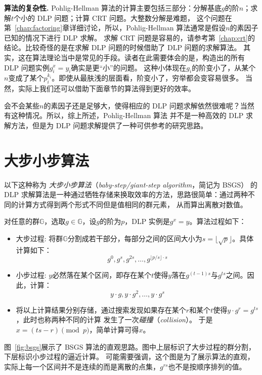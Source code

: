 \noindent \textbf{算法的复杂性.}
Pohlig-Hellman 算法的计算主要包括三部分：分解基底$g$的阶$n$；求解$t$个小的 DLP 问题；计算 CRT 问题。大整数分解是难题，
这个问题在第~\ref{chap:factoring}章详细讨论，所以，Pohlig-Hellman 算法通常是假设$n$的素因子已知的情况下进行 DLP 求解。
求解 CRT 问题是容易的，请参考第~\ref{chap:crt}的结论。比较奇怪的是在求解 DLP 问题的时候借助了 DLP 问题的求解算法。
其实，这在算法理论当中是常见的手段。读者在此需要体会的是，构造出的所有 DLP 问题实例$g_i^x  = y_i$确实是更“小”的问题。
这种小体现在$g_i$的阶变小了，从某个$n$变成了某个$p_i^{k_i}$。即使从最肤浅的层面看，阶变小了，穷举都会变容易很多。
当然，实际上我们还可以借助下面章节的算法得到更好的效率。

会不会某些$n$的素因子还是足够大，使得相应的 DLP 问题求解依然很难呢？当然有这种情况。所以，综上所述，Pohlig-Hellman 算法
并不是一种高效的 DLP 求解方法，但是为 DLP 问题求解提供了一种可供参考的研究思路。

\section{大步小步算法}
\label{sec:bsgs}
以下这种称为
\emph{大步小步算法}（\emph{baby-step/giant-step algorithm}，简记为 BSGS）
的 DLP 求解算法是一种通过牺牲存储来换取效率的方法，思路很简单：通过两种不同的计算方式得到两个形式不同但是值相同的群元素，
从而算出离散对数值。

对任意的群$\mathbb{G}$，选取$g \in \mathbb{G}$，设$g$的阶为$p$，DLP 实例是$g^x = y$。算法过程如下：
\begin{itemize}
\item 大步过程:  将群$\mathbb{G}$分割成若干部分，每部分之间的区间大小为$s = \lfloor \sqrt{p} \rfloor$。具体计算如下：
\[ g^0, g^s, g^{2s}, \ldots , g^{\lfloor p/s \rfloor \cdot s} \]

\item 小步过程: $y$必然落在某个区间，即存在某个$t$使得$y$落在$g^{(t-1)s}$与$g^{ts} $之间。因此，计算：
\[y\cdot g, y\cdot g^2, \ldots, y\cdot g^s\]

\item 将以上计算结果分别存储，通过搜索发现如果存在某个$r$和某个$t$使得$y \cdot g^r = g^{t s}$，此时也称两种不同的计算
发生了一次\emph{碰撞}（\emph{collision}）。
于是$x = (ts - r) \pmod{p}$，简单计算可得$x$。
\end{itemize}

图~\ref{fig:bsgs}展示了 BSGS 算法的直观思路。图中上层标识了大步过程的群分割，下层标识小步过程的逼近计算。
可能需要强调，这个图是为了展示算法的直观，实际上每一个区间并不是连续的而是离散的点集，$g^{rs}$也不是按顺序排列的值。

